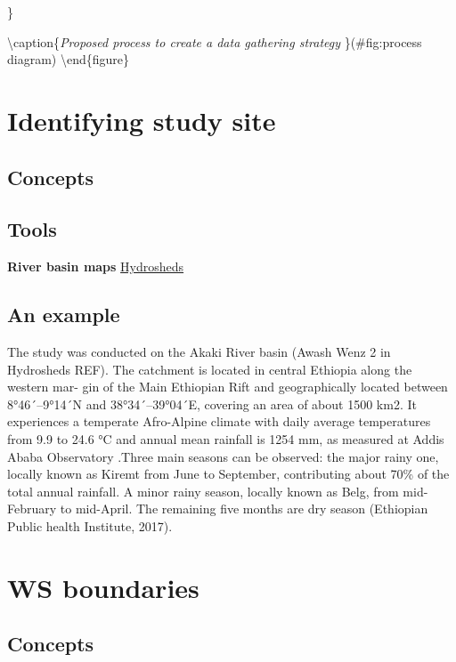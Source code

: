 \documentclass[
]{book}
\begin{document}
\}

\textbackslash caption\{\emph{Proposed process to create a data gathering strategy} \}(\#fig:process diagram)
\textbackslash end\{figure\}

\hypertarget{intro}{%
\chapter{Identifying study site}\label{intro}}

\hypertarget{concepts}{%
\section{Concepts}\label{concepts}}

\hypertarget{tools}{%
\section{Tools}\label{tools}}

\textbf{River basin maps}
\href{https://hydrosheds.org}{Hydrosheds}

\hypertarget{an-example}{%
\section{An example}\label{an-example}}

The study was conducted on the Akaki River basin (Awash Wenz 2 in Hydrosheds REF). The catchment is located in central Ethiopia along the western mar- gin of the Main Ethiopian Rift and geographically located between 8°46´--9°14´N and 38°34´--39°04´E, covering an area of about 1500 km2. It experiences a temperate Afro-Alpine climate with daily average temperatures from 9.9 to 24.6 °C and annual mean rainfall is 1254 mm, as measured at Addis Ababa Observatory .Three main seasons can be observed: the major rainy one, locally known as Kiremt from June to September, contributing about 70\% of the total annual rainfall. A minor rainy season, locally known as Belg, from mid-February to mid-April. The remaining five months are dry season (Ethiopian Public health Institute, 2017).

\hypertarget{boundaries}{%
\chapter{WS boundaries}\label{boundaries}}

\hypertarget{concepts-1}{%
\section{Concepts}\label{concepts-1}}
\end{document}
